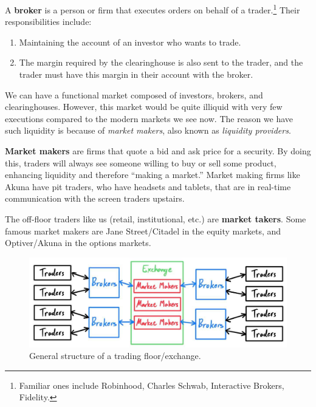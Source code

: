 \documentclass{article}
\begin{document}
    \begin{definition}[Broker]
      A \textbf{broker} is a person or firm that executes orders on behalf of a trader.\footnote{Familiar ones include Robinhood, Charles Schwab, Interactive Brokers, Fidelity.} Their responsibilities include: 
      \begin{enumerate}
        \item Maintaining the account of an investor who wants to trade. 
        \item The margin required by the clearinghouse is also sent to the trader, and the trader must have this margin in their account with the broker. 
      \end{enumerate}
    \end{definition}

    We can have a functional market composed of investors, brokers, and clearinghouses. However, this market would be quite illiquid with very few executions compared to the modern markets we see now. The reason we have such liquidity is because of \textit{market makers}, also known as \textit{liquidity providers}. 

    \begin{definition}
      \textbf{Market makers} are firms that quote a bid and ask price for a security. By doing this, traders will always see someone willing to buy or sell some product, enhancing liquidity and therefore ``making a market.'' Market making firms like Akuna have pit traders, who have headsets and tablets, that are in real-time communication with the screen traders upstairs. 
    \end{definition}

    The off-floor traders like us (retail, institutional, etc.) are \textbf{market takers}. Some famous market makers are Jane Street/Citadel in the equity markets, and Optiver/Akuna in the options markets.   

    \begin{figure}[H]
      \centering 
      \includegraphics[scale=0.3]{img/exchange.jpg}
      \caption{General structure of a trading floor/exchange.} 
      \label{fig:exchange}
    \end{figure}
\end{document}
